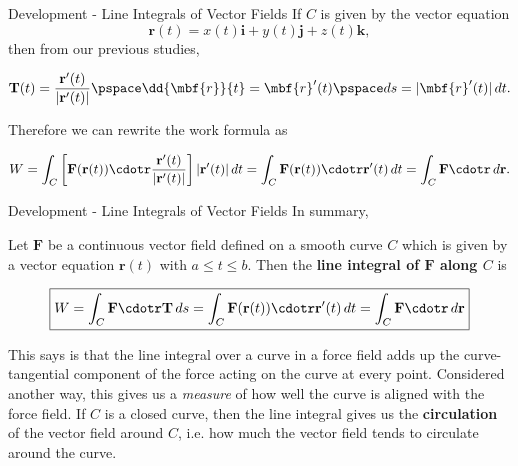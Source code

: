 \documentclass[11pt,english,
handout
]{beamer}
\begin{document}
\begin{frame}[t]{Development - Line Integrals of Vector Fields}
\small
If $C$ is given by the vector equation 
\[
\mathbf{r}(t)=x(t)\mathbf{i}+y(t)\mathbf{j}+z(t)\mathbf{k},
\] 
then from our previous studies,

\[
\mathbf{T}(t)=\frac{\mathbf{r}'(t)}{|\mathbf{r}'(t)|}\pspace \dd{\mbf{r}}{t}=\mbf{r}'(t) \pspace ds=|\mbf{r}'(t)|\,dt.
\]\pause 

Therefore we can rewrite the work formula as

\[
W=\int_C\left[\mathbf{F}(\mathbf{r}(t))\cdotr\frac{\mathbf{r}'(t)}{|\mathbf{r}'(t)|}\right]|\mathbf{r}'(t)|\,dt= \int_C\mathbf{F}(\mathbf{r}(t))\cdotr\mathbf{r}'(t)\,dt=\int_C\mathbf{F}\cdotr\,d\mathbf{r}.
\]
\end{frame}




\begin{frame}[t]{Development - Line Integrals of Vector Fields}
\footnotesize
In summary,

\lspace
\begin{definition}
Let $\mathbf{F}$ be a continuous vector field defined on a smooth curve $C$ which is given by a vector equation $\mathbf{r}(t)$ with $a\leq t\leq b$. Then the \textbf{line integral of $\mathbf{F}$ along $C$} is

\lspace
\[
\boxed{W=\int_C\mathbf{F}\cdotr\mathbf{T}\,ds=\int_C\mathbf{F}(\mathbf{r}(t))\cdotr\mathbf{r}'(t)\,dt=\int_C\mathbf{F}\cdotr\,d\mathbf{r}}
\]
\end{definition}\pause
\lspace
This says is that the line integral over a curve in a force field adds up the curve-tangential component of the force acting on the curve at every point. \pause Considered another way, this gives us a \textit{measure} of how well the curve is aligned with the force field. \pause If $C$ is a closed curve, then the line integral gives us the \textbf{circulation} of the vector field around $C$, i.e. how much the vector field tends to circulate around the curve.

\end{frame}
\end{document}
